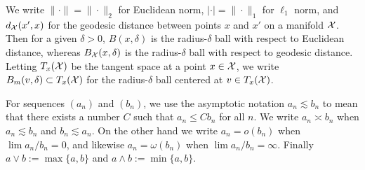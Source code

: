 We write $\|\cdot\| = \|\cdot\|_2$ for Euclidean norm, $|\cdot| = \|\cdot\|_1$ for $\ell_1$ norm, and $d_{\mathcal{X}}(x',x)$ for the geodesic distance between points $x$ and $x'$ on a manifold $\mathcal{X}$. Then for a given $\delta > 0$, $B(x,\delta)$ is the radius-$\delta$ ball with respect to Euclidean distance, whereas $B_{\mathcal{X}}(x,\delta)$ is the radius-$\delta$ ball with respect to geodesic distance. Letting $T_x(\mathcal{X})$ be the tangent space at a point $x \in \mathcal{X}$, we write $B_m(v,\delta) \subset T_x(\mathcal{X})$ for the radius-$\delta$ ball centered at $v \in T_x(\mathcal{X})$.

For sequences $(a_n)$ and $(b_n)$, we use the asymptotic notation $a_n \lesssim b_n$ to mean that there exists a number $C$ such that $a_n \leq C b_n$ for all $n$. We write $a_n \asymp b_n$ when $a_n \lesssim b_n$ and $b_n \lesssim a_n$. On the other hand we write $a_n = o(b_n)$ when $\lim a_n/b_n = 0$, and likewise $a_n = \omega(b_n)$ when $\lim a_n/b_n = \infty$. Finally $a \vee b := \max\{a,b\}$ and $a \wedge b := \min\{a,b\}$.


